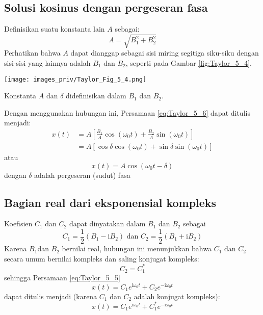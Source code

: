 \subsection*{Solusi kosinus dengan pergeseran fasa}

Definisikan suatu konstanta lain $A$ sebagai:
\begin{equation}
A = \sqrt{B_{1}^{2} + B_{2}^{2}}
\label{eq:Taylor_5_10}
\end{equation}
Perhatikan bahwa $A$ dapat dianggap sebagai sisi miring segitiga siku-siku dengan
sisi-sisi yang lainnya adalah $B_1$ dan $B_2$, seperti pada Gambar \ref{fig:Taylor_5_4}.

\begin{marginfigure}
\texttt{[image: images\_priv/Taylor\_Fig\_5\_4.png]}
\caption{Konstanta $A$ dan $\delta$ didefinisikan dalam $B_1$ dan $B_2$.}
\label{fig:Taylor_5_4}
\end{marginfigure}

Dengan menggunakan hubungan ini, Persamaan \eqref{eq:Taylor_5_6} dapat
ditulis menjadi:
\begin{align*}
x(t) & = A \left[\frac{B_{1}}{A}\cos(\omega_0 t) + \frac{B_{2}}{A}\sin(\omega_0 t) \right] \\
     & = A\left[ \cos\delta\cos(\omega_0 t)+\sin\delta\sin(\omega_0 t) \right]
\end{align*}
atau
\begin{equation}
  x(t) = A \cos(\omega_0 t - \delta)
  \label{eq:Taylor_5_11}
\end{equation}
dengan $\delta$ adalah pergeseran (sudut) fasa


\subsection*{Bagian real dari eksponensial kompleks}

Koefisien $C_1$ dan $C_2$ dapat dinyatakan dalam $B_1$ dan $B_2$ sebagai
\begin{equation}
C_{1} = \frac{1}{2}(B_{1} - \mathrm{i}B_{2}) \text{ dan }
C_{2} = \frac{1}{2}(B_{1} + \mathrm{i}B_{2})
\label{eq:Taylor_5_12}
\end{equation}
Karena $B_{1}$dan $B_{2}$ bernilai real, hubungan ini menunjukkan bahwa
$C_{1}$ dan $C_{2}$ secara umum bernilai kompleks dan saling konjugat kompleks:
\begin{equation*}
C_{2} = C_{1}^{*}
\end{equation*}
sehingga Persamaan \eqref{eq:Taylor_5_5}
\begin{equation*}
x(t) = C_{1}e^{\mathrm{i}\omega_0 t} + C_{2}e^{-\mathrm{i}\omega_0 t}
\end{equation*}
dapat ditulis menjadi (karena $C_1$ dan $C_2$ adalah konjugat kompleks):
\begin{equation}
x(t) = C_{1}e^{\mathrm{i}\omega_0 t} + C_{1}^{*}e^{-\mathrm{i}\omega_0 t}
\label{eq:Taylor_5_13}
\end{equation}

